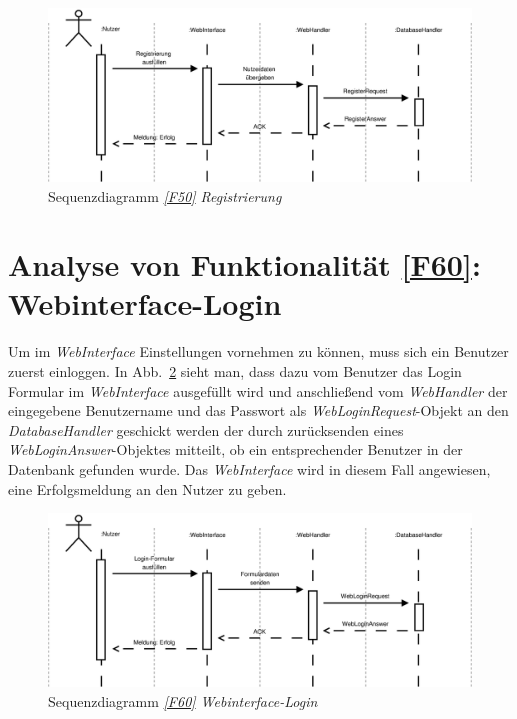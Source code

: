 \begin{figure}[h]
\centering
\includegraphics[width=1\textwidth]{Systementwurf/02_produktfunktionsanalyse/f500}
\caption{Sequenzdiagramm \textit{\ref{F50} Registrierung}
\label{sd50}}
\end{figure}


\section{Analyse von Funktionalität \ref{F60}: Webinterface-Login}

Um im \textit{WebInterface} Einstellungen vornehmen zu können, muss sich ein
Benutzer zuerst einloggen. In Abb.~\ref{sd60} sieht man, dass dazu vom Benutzer
das Login Formular im \textit{WebInterface} ausgefüllt wird und anschließend vom
\textit{WebHandler} der eingegebene Benutzername und das Passwort als
\textit{WebLoginRequest}-Objekt an den \textit{DatabaseHandler} geschickt werden
der durch zurücksenden eines \textit{WebLoginAnswer}-Objektes mitteilt, ob ein
entsprechender Benutzer in der Datenbank gefunden wurde. Das
\textit{WebInterface} wird in diesem Fall angewiesen, eine Erfolgsmeldung an den
Nutzer zu geben.

\begin{figure}[h]
\centering
\includegraphics[width=1\textwidth]{Systementwurf/02_produktfunktionsanalyse/f600}
\caption{Sequenzdiagramm \textit{\ref{F60} Webinterface-Login}
\label{sd60}}
\end{figure}



